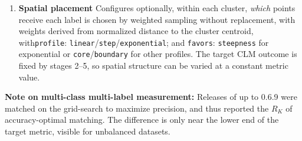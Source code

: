 \documentclass[a4paper,12pt]{article}
\begin{document}
\begin{enumerate}
    \item \textbf{Spatial placement} Configures optionally, within each cluster, \emph{which} points receive each label is chosen by weighted sampling without replacement, with weights derived from normalized distance to the cluster centroid, with\texttt{profile}: \texttt{linear}/\texttt{step}/\texttt{exponential}; and \texttt{favors}: \texttt{steepness} for exponential or \texttt{core}/\texttt{boundary} for other profiles. The target CLM outcome is fixed by stages 2--5, so spatial structure can be varied at a constant metric value.
    
\end{enumerate}

\noindent\textbf{Note on multi-class multi-label measurement:} Releases of up to 0.6.9 were matched on the grid-search to maximize precision, and thus reported the $R_K$ of accuracy-optimal matching. The difference is only near the lower end of the target metric, visible for unbalanced datasets.
\newpage
\end{document}
